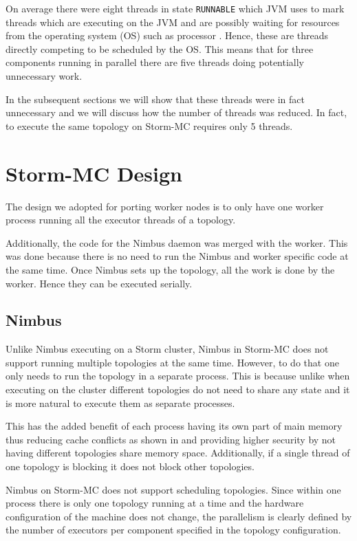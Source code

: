 \documentclass[bsc,logo,frontabs,twoside,singlespacing,normalheadings,parskip]{infthesis}\usepackage[]{graphicx}\usepackage[]{color}
\begin{document}
On average there were eight threads in state \texttt{RUNNABLE} which JVM uses to mark threads which are executing on the JVM and are possibly waiting for resources from the operating system (OS) such as processor \citep{JavaThreads}. Hence, these are threads directly competing to be scheduled by the OS. This means that for three components running in parallel there are five threads doing potentially unnecessary work.

In the subsequent sections we will show that these threads were in fact unnecessary and we will discuss how the number of threads was reduced. In fact, to execute the same topology on Storm-MC requires only 5 threads.

\section{Storm-MC Design}
\label{sec:storm_mc_arch}

The design we adopted for porting worker nodes is to only have one worker process running all the executor threads of a topology.

Additionally, the code for the Nimbus daemon was merged with the worker. This was done because there is no need to run the Nimbus and worker specific code at the same time. Once Nimbus sets up the topology, all the work is done by the worker. Hence they can be executed serially.

\subsection{Nimbus}

Unlike Nimbus executing on a Storm cluster, Nimbus in Storm-MC does not support running multiple topologies at the same time. However, to do that one only needs to run the topology in a separate process. This is because unlike when executing on the cluster different topologies do not need to share any state and it is more natural to execute them as separate processes.

This has the added benefit of each process having its own part of main memory thus reducing cache conflicts as shown in \citep{Chandra:2005:PIC:1042442.1043432} and providing higher security by not having different topologies share memory space. Additionally, if a single thread of one topology is blocking it does not block other topologies.

Nimbus on Storm-MC does not support scheduling topologies. Since within one process there is only one topology running at a time and the hardware configuration of the machine does not change, the parallelism is clearly defined by the number of executors per component specified in the topology configuration.
\end{document}
